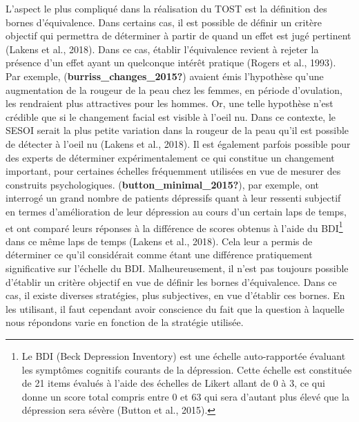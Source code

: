 \documentclass[
  english,
  man]{apa6}
\begin{document}
L'aspect le plus compliqué dans la réalisation du TOST est la définition des bornes d'équivalence. Dans certains cas, il est possible de définir un critère objectif qui permettra de déterminer à partir de quand un effet est jugé pertinent (Lakens et al., 2018). Dans ce cas, établir l'équivalence revient à rejeter la présence d'un effet ayant un quelconque intérêt pratique (Rogers et al., 1993). Par exemple, (\textbf{burriss\_changes\_2015?}) avaient émis l'hypothèse qu'une augmentation de la rougeur de la peau chez les femmes, en période d'ovulation, les rendraient plus attractives pour les hommes. Or, une telle hypothèse n'est crédible que si le changement facial est visible à l'oeil nu. Dans ce contexte, le SESOI serait la plus petite variation dans la rougeur de la peau qu'il est possible de détecter à l'oeil nu (Lakens et al., 2018). Il est également parfois possible pour des experts de déterminer expérimentalement ce qui constitue un changement important, pour certaines échelles fréquemment utilisées en vue de mesurer des construits psychologiques. (\textbf{button\_minimal\_2015?}), par exemple, ont interrogé un grand nombre de patients dépressifs quant à leur ressenti subjectif en termes d'amélioration de leur dépression au cours d'un certain laps de temps, et ont comparé leurs réponses à la différence de scores obtenus à l'aide du BDI\footnote{Le BDI (Beck Depression Inventory) est une échelle auto-rapportée évaluant les symptômes cognitifs courants de la dépression.  Cette échelle est constituée de 21 items évalués à l'aide des échelles de Likert allant de 0 à 3, ce qui donne un score total compris entre 0 et 63 qui sera d'autant plus élevé que la dépression sera sévère (Button et al., 2015).} dans ce même laps de temps (Lakens et al., 2018). Cela leur a permis de déterminer ce qu'il considérait comme étant une différence pratiquement significative sur l'échelle du BDI. Malheureusement, il n'est pas toujours possible d'établir un critère objectif en vue de définir les bornes d'équivalence. Dans ce cas, il existe diverses stratégies, plus subjectives, en vue d'établir ces bornes. En les utilisant, il faut cependant avoir conscience du fait que la question à laquelle nous répondons varie en fonction de la stratégie utilisée.
\end{document}
